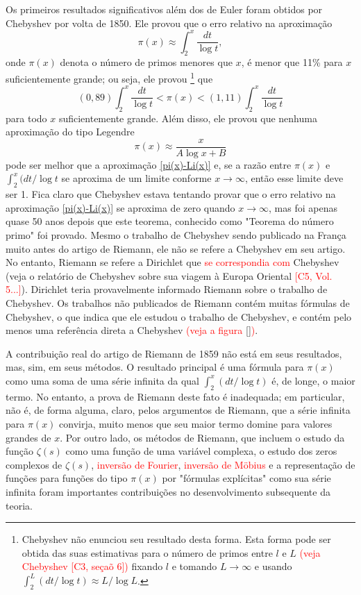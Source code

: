     Os primeiros resultados significativos além dos de Euler foram obtidos por Chebyshev por volta de 1850. Ele provou que o erro relativo na aproximação
    \begin{equation}
        \label{pi(x)-Li(x)}
        \pi(x) \approx \int_{2}^{x} \frac{dt}{\log t},
    \end{equation}
    onde $\pi(x)$ denota o número de primos menores que $x$, é menor que 11\% para $x$ suficientemente grande; ou seja, ele provou
    \footnote{
    Chebyshev não enunciou seu resultado desta forma. Esta forma pode ser obtida das suas estimativas para o número de primos entre $l$ e $L$ \textcolor{red}{(veja Chebyshev [C3, seçaõ 6])} fixando $l$ e tomando $L \to \infty$ e usando $\int_{2}^{L}(dt/\log t) \approx L/\log L$.}
    que
    \begin{equation*}
        (0,89)\int_{2}^{x} \frac{dt}{\log t} < \pi(x) < (1,11)\int_{2}^{x} \frac{dt}{\log t}
    \end{equation*}
    para todo $x$ suficientemente grande. Além disso, ele provou que nenhuma aproximação do tipo Legendre
    $$ \pi(x) \approx \frac{x}{A\log x + B} $$
    pode ser melhor que a aproximação \eqref{pi(x)-Li(x)} e, se a razão entre $\pi(x)$ e $\int_{2}^{x} (dt/\log t$ se aproxima de um limite conforme $x \to \infty$, então esse limite deve ser 1. Fica claro que Chebyshev estava tentando provar que o erro relativo na aproximação \eqref{pi(x)-Li(x)} se aproxima de zero quando $x \to \infty$, mas foi apenas quase 50 anos depois que este teorema, conhecido como "Teorema do número primo" foi provado. Mesmo o trabalho de Chebyshev sendo publicado na França muito antes do artigo de Riemann, ele não se refere a Chebyshev em seu artigo. No entanto, Riemann se refere a Dirichlet que \textcolor{red}{se correspondia com} Chebyshev (veja o relatório de Chebyshev sobre sua viagem à Europa Oriental \textcolor{red}{[C5, Vol. 5...]}). Dirichlet teria provavelmente informado Riemann sobre o trabalho de Chebyshev. Os trabalhos não publicados de Riemann contém muitas fórmulas de Chebyshev, o que indica que ele estudou o trabalho de Chebyshev, e contém pelo menos uma referência direta a Chebyshev \textcolor{red}{(veja a figura \ref{})}.
    
    A contribuição real do artigo de Riemann de 1859 não está em seus resultados, mas, sim, em seus métodos. O resultado principal é uma fórmula para $\pi(x)$ como uma soma de uma série infinita da qual $\int_{2}^{x}(dt/\log t)$ é, de longe, o maior termo. No entanto, a prova de Riemann deste fato é inadequada; em particular, não é, de forma alguma, claro, pelos argumentos de Riemann, que a série infinita para $\pi(x)$ convirja, muito menos que seu maior termo domine para valores grandes de $x$. Por outro lado, os métodos de Riemann, que incluem o estudo da função $\zeta(s)$ como uma função de uma variável complexa, o estudo dos zeros complexos de $\zeta(s)$, \textcolor{red}{inversão de Fourier}, \textcolor{red}{inversão de Möbius} e a representação de funções para funções do tipo $\pi(x)$ por "fórmulas explícitas" como sua série infinita foram importantes contribuições no desenvolvimento subsequente da teoria.
    
